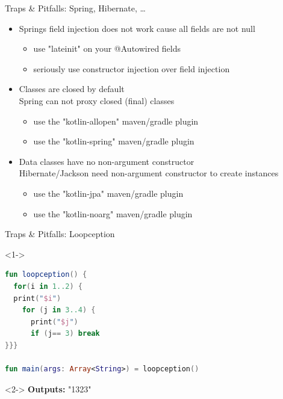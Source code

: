\begin{frame}{Traps \& Pitfalls: Spring, Hibernate, \dots}
	\begin{itemize}
		\item Springs field injection does not work cause all fields are not null
		\begin{itemize}
			\item use "lateinit" on your @Autowired fields
			\item seriously use constructor injection over field injection
		\end{itemize}
		\item Classes are closed by default\\
		Spring can not proxy closed (final) classes
		\begin{itemize}
			\item use the "kotlin-allopen" maven/gradle plugin
			\item use the "kotlin-spring" maven/gradle plugin
		\end{itemize}
		\item Data classes have no non-argument constructor\\
		Hibernate/Jackson need non-argument constructor to create instances
		\begin{itemize}
			\item use the "kotlin-jpa" maven/gradle plugin
			\item use the "kotlin-noarg" maven/gradle plugin
		\end{itemize}
	\end{itemize}
\end{frame}

\begin{frame}[fragile]{Traps \& Pitfalls: Loopception}
	\begin{overlayarea}{\textwidth}{\textheight}
		\begin{onlyenv}<1->
\begin{lstlisting}[language=Kotlin,basicstyle=\ttfamily\small]
fun loopception() {
  for(i in 1..2) {
  print("$i")
    for (j in 3..4) {
      print("$j")
      if (j== 3) break
}}}

fun main(args: Array<String>) = loopception()
\end{lstlisting}
		\end{onlyenv}
		\begin{onlyenv}<2->
			\textbf{Outputs:} "1323"
		\end{onlyenv}
	\end{overlayarea}
\end{frame}

